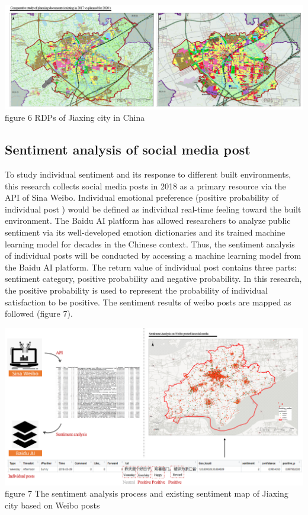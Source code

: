 \documentclass[
]{article}
\begin{document}
\href{https://WTHSYZW.github.io/Thesis_2022/maps/RDP.png}{\includegraphics{maps/RDP.png}}
figure 6 RDPs of Jiaxing city in China

\hypertarget{sentiment-analysis-of-social-media-post}{%
\subsection{Sentiment analysis of social media
post}\label{sentiment-analysis-of-social-media-post}}

To study individual sentiment and its response to different built
environments, this research collects social media posts in 2018 as a
primary resource via the API of Sina Weibo. Individual emotional
preference (positive probability of individual post ) would be defined
as individual real-time feeling toward the built environment. The Baidu
AI platform has allowed researchers to analyze public sentiment via its
well-developed emotion dictionaries and its trained machine learning
model for decades in the Chinese context. Thus, the sentiment analysis
of individual posts will be conducted by accessing a machine learning
model from the Baidu AI platform. The return value of individual post
contains three parts: sentiment category, positive probability and
negative probability. In this research, the positive probability is used
to represent the probability of individual satisfaction to be positive.
The sentiment results of weibo posts are mapped as followed (figure 7).

\href{https://WTHSYZW.github.io/Thesis_2022/maps/sentiment.pdf}{\includegraphics{maps/sentiment.png}}
figure 7 The sentiment analysis process and existing sentiment map of
Jiaxing city based on Weibo posts
\end{document}
